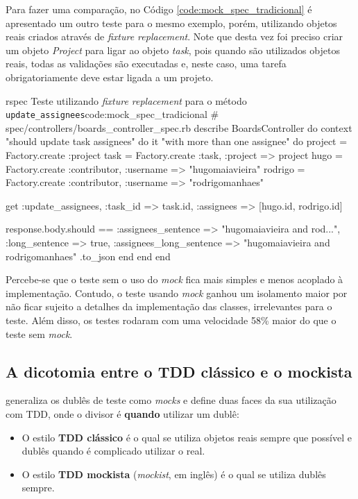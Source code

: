 Para fazer uma comparação, no Código \ref{code:mock_spec_tradicional} é apresentado um outro teste para o mesmo exemplo, porém, utilizando objetos reais criados através de \textit{fixture replacement}. Note que desta vez foi preciso criar um objeto \textit{Project} para ligar ao objeto \textit{task}, pois quando são utilizados objetos reais, todas as validações são executadas e, neste caso, uma tarefa obrigatoriamente deve estar ligada a um projeto.

\begin{mycode}{rspec}%
{Teste utilizando \textit{fixture replacement} para o método \texttt{update\_assignees}}{code:mock_spec_tradicional}
# spec/controllers/boards_controller_spec.rb
describe BoardsController do
  context "should update task assignees" do
    it "with more than one assignee" do
      project = Factory.create :project
      task = Factory.create :task, :project => project
      hugo = Factory.create :contributor, :username => "hugomaiavieira"
      rodrigo = Factory.create :contributor, :username => "rodrigomanhaes"

      get :update_assignees, :task_id => task.id, :assignees => [hugo.id, rodrigo.id]

      response.body.should ==
        { :assignees_sentence => "hugomaiavieira and rod...",
          :long_sentence => true,
          :assignees_long_sentence => "hugomaiavieira and rodrigomanhaes" }.to_json
    end
  end
end
\end{mycode}

Percebe-se que o teste sem o uso do \textit{mock} fica mais simples e menos acoplado à implementação. Contudo, o teste usando \textit{mock} ganhou um isolamento maior por não ficar sujeito a detalhes da implementação das classes, irrelevantes para o teste. Além disso, os testes rodaram com uma velocidade 58\% maior do que o teste sem \textit{mock}.


\subsection{A dicotomia entre o TDD clássico e o mockista}
\label{sub:tdd_classico_e_mockista}

 generaliza os dublês de teste como \textit{mocks} e define duas faces da sua utilização com TDD, onde o divisor é \textbf{quando} utilizar um dublê:

\begin{itemize}
  \item O estilo \textbf{TDD clássico} é o qual se utiliza objetos reais sempre que possível e dublês quando é complicado utilizar o real.

  \item O estilo \textbf{TDD mockista} (\textit{mockist}, em inglês) é o qual se utiliza dublês sempre.
\end{itemize}


